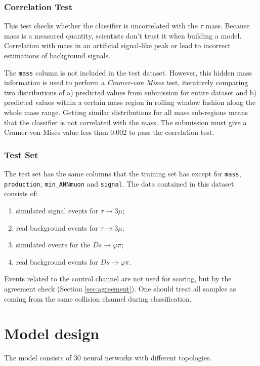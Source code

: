 \documentclass[conference]{IEEEtran}
\begin{document}
\subsubsection{Correlation Test}
\label{sec:correlation}
This test checks whether the classifier is uncorrelated with the $\tau$ mass.
Because mass is a measured quantity, scientists don't trust it when building a
model. Correlation with mass in an artificial signal-like peak or lead to
incorrect estimations of background signals.

The \texttt{mass} column is not included in the test dataset. However, this hidden
mass information is used to perform a \textit{Cramer-von Mises} test,
iteratively comparing two distributions of a) predicted values from submission
for entire dataset and b) predicted values within a certain mass region in
rolling window fashion along the whole mass range. Getting similar distributions
for all mass sub-regions means that the classifier is not correlated with the
mass. The submission must give a Cramer-von Mises value less than 0.002 to pass
the correlation test.

\subsubsection{Test Set}
\label{sec:test-set}
The test set has the same columns that the training set has except for
\texttt{mass}, \texttt{production}, \texttt{min\_ANNmuon} and \texttt{signal}.
The data contained in this dataset consists of:
\begin{enumerate}
	\item simulated signal events for $\tau \rightarrow 3\mu$;
	\item real background events for $\tau \rightarrow 3\mu$;
	\item simulated events for the $Ds \rightarrow \varphi\pi$;
	\item real background events for $Ds \rightarrow \varphi\pi$.
\end{enumerate}
Events related to the control channel are not used for scoring, but by the
agreement check (Section \ref{sec:agreement}). One should treat all samples as
coming from the same collision channel during classification.

\section{Model design}
\label{sec:model_design}
The model consists of 30 neural networks with different topologies.
\end{document}
